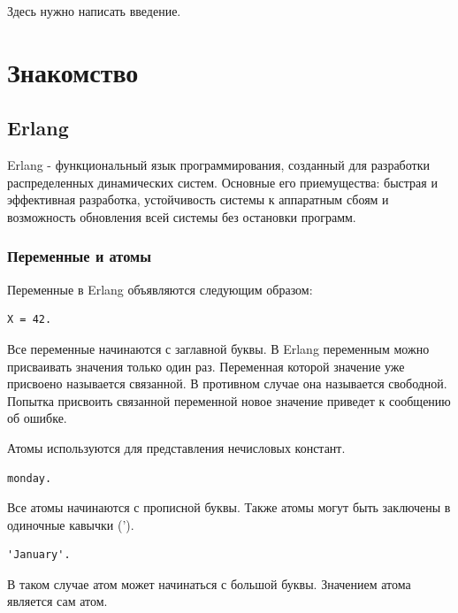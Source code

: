 





\Intro

Здесь нужно написать введение.

\section{Знакомство}
	\subsection{Erlang}
		Erlang - функциональный язык программирования, созданный для разработки
		распределенных динамических систем. Основные его приемущества: быстрая и 
		эффективная разработка, устойчивость системы к аппаратным сбоям и 
		возможность обновления всей системы без остановки программ.

		\subsubsection{Переменные и атомы} 
			Переменные в Erlang объявляются следующим образом:
			\begin{lstlisting}
X = 42.
			\end{lstlisting}
			Все переменные начинаются с заглавной буквы. В Erlang переменным 
			можно присваивать значения только один раз. Переменная которой 
			значение уже присвоено называется связанной. В противном случае 
			она называется свободной. Попытка присвоить связанной переменной 
			новое значение приведет к сообщению об ошибке.

			Атомы используются для представления нечисловых констант. 
			\begin{lstlisting}
monday.
			\end{lstlisting}
			Все атомы начинаются с прописной буквы. Также атомы могут быть 
			заключены в одиночные кавычки ('). 
			\begin{lstlisting}
'January'.
			\end{lstlisting}
			В таком случае атом может начинаться с большой буквы.
			Значением атома является сам атом.  
	


